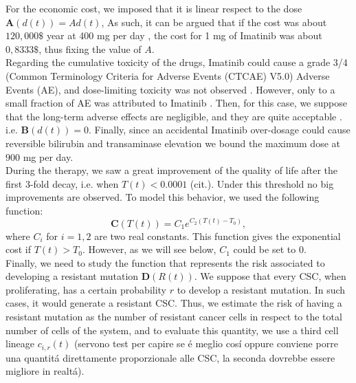 \documentclass[a4paper,10pt]{article}
\begin{document}
For the economic cost, we imposed that it is  linear respect to 
the dose $\mathbf{A}(d(t))=Ad(t)$, As such, it can be argued that if the cost was about
$120,000\$$ year at 400 mg per day \cite{chen2017journey}, the cost for 1 mg
of Imatinib was about $0,8333\$$, thus fixing the value of $A$.\\
Regarding the cumulative toxicity of the drugs,
Imatinib could cause a grade 3/4 (Common Terminology Criteria for Adverse Events (CTCAE)
V5.0) Adverse Events (AE), and dose-limiting toxicity was not
observed \cite{cohen2002approval}. However, only to a small fraction of AE 
was attributed to Imatinib \cite{cohen2002approval}. Then, 
for this case, we suppose that the long-term
adverse effects are negligible, and they are quite acceptable \cite{mughal2010principal}.
i.e. $\mathbf{B}(d(t))=0$. Finally, since an accidental Imatinib
over-dosage could cause reversible bilirubin 
and transaminase elevation \cite{cohen2002approval}
we bound the maximum dose at $900$ mg per day.\\ 
During the therapy, we saw a great improvement of the quality of life
after the first 3-fold decay, i.e. when $T(t)<0.0001$ (cit.). Under this threshold
no big improvements are observed. To model this behavior, we used the following function:
\begin{equation}
\mathbf{C}(T(t))=C_1e^{C_2(T(t)-T_0)}, 
\end{equation}
where $C_i$ for $i=1,2$ are two real constants. This function gives the exponential cost
if $T(t)>T_0$. However, as we will see below, $C_1$ could be set to 0.\\
Finally, we need to study the function that represents the risk associated to developing a 
resistant mutation $\mathbf{D}(R(t))$. 
We suppose that every CSC, when proliferating, 
has a certain probability $r$ to develop a resistant mutation. In such cases, it would
generate a resistant CSC.
Thus, we estimate the risk of having a resistant mutation as the number of resistant cancer cells
in respect to the total number of cells of the system, and to evaluate this quantity, we use a third
cell lineage $c_{i,r}(t)$ (servono test per capire se \'e meglio cos\'i oppure conviene
porre una quantit\'a direttamente
proporzionale alle CSC, la seconda dovrebbe essere migliore in realt\'a).

\printbibliography
\end{document}
